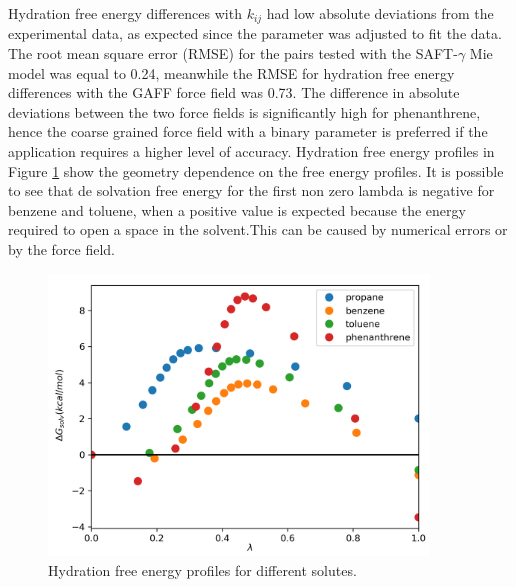 Hydration free energy differences with $k_{ij}$ had low absolute deviations from the experimental data, as expected since the parameter was adjusted to fit the data. The root mean square error (RMSE) for the pairs tested with the SAFT-$\gamma$ 	Mie model was equal to 0.24, meanwhile the RMSE for hydration free energy differences with the GAFF force field \cite{PMID:24928188} was 0.73. The difference in absolute deviations between the two force fields is significantly high for phenanthrene, hence the coarse grained force field with a binary parameter is preferred if the application requires a higher level of accuracy. Hydration free energy profiles in Figure \ref{fig:water} show the geometry  dependence on the free energy profiles. It is possible to see that de solvation free energy for the first non zero lambda is negative for benzene and toluene, when a positive value is expected because the energy required to open a space in the solvent.This can be caused by numerical errors or by the force field. 


\begin{figure}[H]
\centering
\includegraphics[width=0.9\textwidth]{Figures/water}
\caption{Hydration free energy profiles for different solutes.}
\label{fig:water}
\end{figure}


